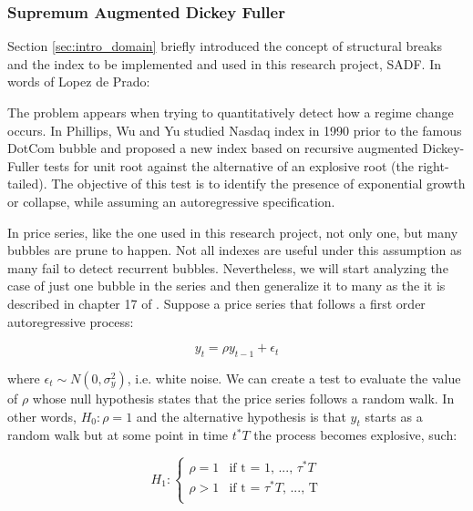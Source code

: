 \subsubsection{Supremum Augmented Dickey Fuller}
\label{sec:methods_features_sadf}

Section \ref{sec:intro_domain} briefly introduced the concept of structural
breaks and the index to be implemented and used in this research project, SADF.
In words of Lopez de Prado:


The problem appears when trying to quantitatively detect how a regime change
occurs. In \cite{sadf_paper} Phillips, Wu and Yu studied Nasdaq index in 1990
prior to the famous DotCom bubble and proposed a new index based on recursive 
augmented Dickey-Fuller tests for unit root against the alternative of an
explosive root (the right-tailed). The objective of this test is to identify
the presence of exponential growth or collapse, while assuming an autoregressive
specification.

In price series, like the one used in this research project, not only
one, but many bubbles are prune to happen. Not all indexes are useful under this
assumption as many fail to detect recurrent bubbles. Nevertheless, we will start
analyzing the case of just one bubble in the series and then generalize it to
many as the it is described in chapter 17 of \cite{lopez_de_prado}. Suppose a
price series that follows a first order autoregressive process:

\[ y_{t} = \rho y_{t-1} + \epsilon_{t} \]

where $\epsilon_{t} \sim N(0, \sigma_{y}^{2})$, i.e. white noise. We can create a
test to evaluate the value of $\rho$ whose null hypothesis states that the price
series follows a random walk. In other words, $H_{0}: \rho = 1$ and the
alternative hypothesis is that $y_t$ starts as a random walk but at some point
in time $t^{*}T$ the process becomes explosive, such:

\begin{equation}
  H_{1} :
    \begin{cases}
      \rho = 1 & \text{if t = 1, ..., $\tau^{*}T$}\\
      \rho > 1 & \text{if t = $\tau^{*}T$, ..., T}\\
    \end{cases}       
\end{equation}

